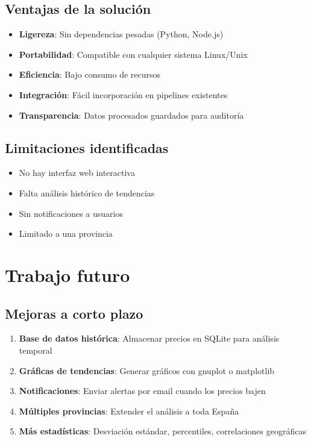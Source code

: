 \subsection{Ventajas de la solución}

\begin{itemize}
  \item \textbf{Ligereza}: Sin dependencias pesadas (Python, Node.js)
  \item \textbf{Portabilidad}: Compatible con cualquier sistema Linux/Unix
  \item \textbf{Eficiencia}: Bajo consumo de recursos
  \item \textbf{Integración}: Fácil incorporación en pipelines existentes
  \item \textbf{Transparencia}: Datos procesados guardados para auditoría
\end{itemize}

\subsection{Limitaciones identificadas}

\begin{itemize}
  \item No hay interfaz web interactiva
  \item Falta análisis histórico de tendencias
  \item Sin notificaciones a usuarios
  \item Limitado a una provincia
\end{itemize}

\section{Trabajo futuro}

\subsection{Mejoras a corto plazo}

\begin{enumerate}
  \item \textbf{Base de datos histórica}: Almacenar precios en SQLite para análisis temporal

  \item \textbf{Gráficas de tendencias}: Generar gráficos con gnuplot o matplotlib

  \item \textbf{Notificaciones}: Enviar alertas por email cuando los precios bajen

  \item \textbf{Múltiples provincias}: Extender el análisis a toda España

  \item \textbf{Más estadísticas}: Desviación estándar, percentiles, correlaciones geográficas
\end{enumerate}

